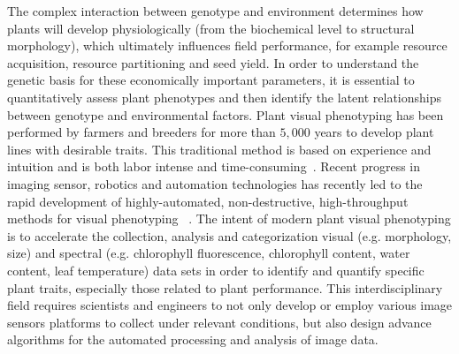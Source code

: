 The complex interaction between genotype and environment determines how plants will develop physiologically (from the biochemical level to structural morphology), which ultimately influences field performance, for example resource acquisition, resource partitioning and seed yield.
In order to understand the genetic basis for these economically important parameters, it is essential to quantitatively assess plant phenotypes and then identify the latent relationships between genotype and environmental factors.
Plant visual phenotyping has been performed by farmers and breeders for more than $5,000$ years to develop plant lines with desirable traits.
This traditional method is based on experience and intuition and is both labor intense and time-consuming~\cite{johannsenerblichkeit}.
Recent progress in imaging sensor, robotics and automation technologies has recently led to the rapid development of highly-automated, non-destructive, high-throughput methods for visual phenotyping ~\cite{furbank2011phenomics,kramer2015plant}.
The intent of modern plant visual phenotyping is to accelerate the collection, analysis and categorization visual (e.g. morphology, size) and spectral (e.g. chlorophyll fluorescence, chlorophyll content, water content, leaf temperature) data sets in order to identify and quantify specific plant traits, especially those related to plant performance.
This interdisciplinary field requires scientists and engineers to not only develop or employ various image sensors platforms to collect under relevant conditions, but also design advance algorithms for the automated processing and analysis of image data.


